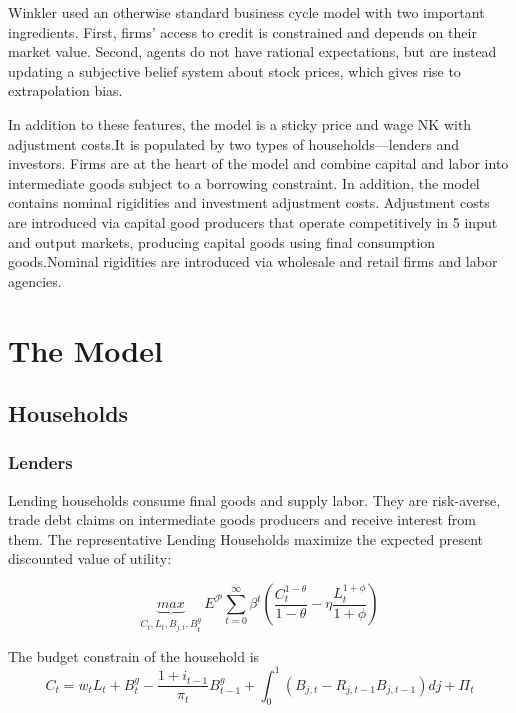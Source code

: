 \documentclass[10pt,math=newtx,citestyle=gb7714-2015,bibstyle=gb7714-2015]{elegantbook}
\begin{document}
{{{	Winkler used an otherwise standard business cycle model with two important ingredients. First, firms’ access to credit is constrained and depends on their market value. Second, agents do not have rational expectations, but are instead updating a subjective belief system about stock prices, which gives rise to extrapolation bias.
	
	In addition to these features, the model is a sticky price and wage NK with adjustment costs.It is populated by two types of households---lenders and investors. Firms are at the heart of the model and combine capital and labor into intermediate goods subject to a borrowing constraint. In addition, the model contains nominal rigidities and investment adjustment costs. Adjustment costs are introduced via capital good producers that operate competitively in
	5 input and output markets, producing capital goods using final consumption goods.Nominal rigidities are introduced via wholesale and retail firms and labor agencies.
	
	\section{The Model}
	\subsection{Households}
	\subsubsection{Lenders}
	Lending households consume final goods and supply labor. They are risk-averse, trade debt claims on intermediate goods producers and receive interest from them.
	The representative Lending Households maximize the expected present discounted value of utility:
	
	\begin{equation*}
		\underbrace{max}_{C_t,L_t,B_{j,t},B_t^g}~\mathit{E}^{\mathcal{P}} \sum_{t=0}^{\infty}\beta^t\left(\frac{C_{t}^{1-\theta}}{1-\theta}-\eta \frac{L_{t}^{1+\phi}}{1+\phi}\right)
	\end{equation*}
	
	The budget constrain of the household is
	\begin{equation*}
		C_t=w_tL_t+B_t^g-\frac{1+i_{t-1}}{\pi_t}B_{t-1}^g+\int_0^1(B_{j,t}-R_{j,t-1}B_{j,t-1})dj+\Pi_t
	\end{equation*}
	
}}}
\end{document}
